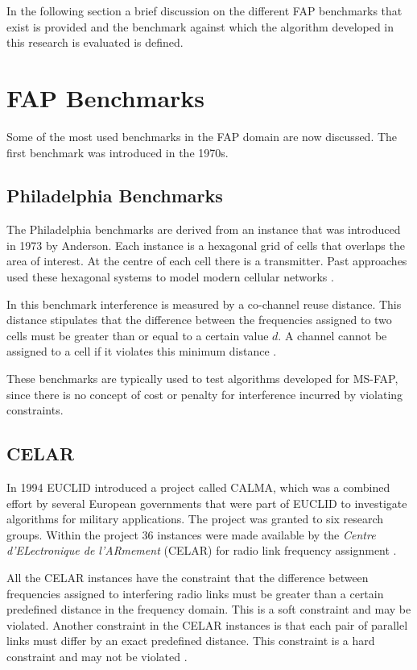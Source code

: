 In the following section a brief discussion on the different \gls{FAP} benchmarks that exist is provided and the benchmark against which the algorithm developed in this research is evaluated is defined.
\section{FAP Benchmarks}
\label{sec:FAPBenchmarks}
Some of the most used benchmarks in the \gls{FAP} domain are now discussed. The first benchmark was introduced in the 1970s.
\subsection{Philadelphia Benchmarks}
The Philadelphia benchmarks are derived from an instance that was introduced in 1973 by Anderson\cite{AndersonPhiladelphia}. Each instance is a hexagonal grid of cells that overlaps the area of interest. At the centre of each cell there is a transmitter. Past approaches used these hexagonal systems to model modern cellular networks \cite{Karen2004,ExactMIFAP}.

In this benchmark interference is measured by a co-channel reuse distance\cite{Karen2004}. This distance stipulates that the difference between the frequencies  assigned to two cells must be greater than or equal to a certain value $d$. A channel cannot be assigned to a cell if it violates this minimum distance \cite{ExactMIFAP}.

These benchmarks are typically used to test algorithms developed for \gls{MS-FAP}, since there is no concept of cost or penalty for interference incurred by violating constraints.
\subsection{CELAR}
In 1994 \gls{EUCLID} introduced a project called CALMA, which was a combined effort by several European governments that were part of \gls{EUCLID} to investigate algorithms for military applications\cite{Karen2004}. The project was granted to six research groups. Within the project 36 instances were made available by the \emph{Centre d'ELectronique de l'ARmement} (CELAR) for radio link frequency assignment \cite{Karen2004,DynamicFAP}.

All the CELAR instances have the constraint that the difference between frequencies assigned to interfering radio links must be greater than a certain predefined distance in the frequency domain\cite{Karen2004}. This is a soft constraint and may be violated. Another constraint in the CELAR instances is that each pair of parallel links must differ by an exact predefined distance\cite{Karen2004}. This constraint is a hard constraint and may not be violated \cite{DynamicFAP}.

